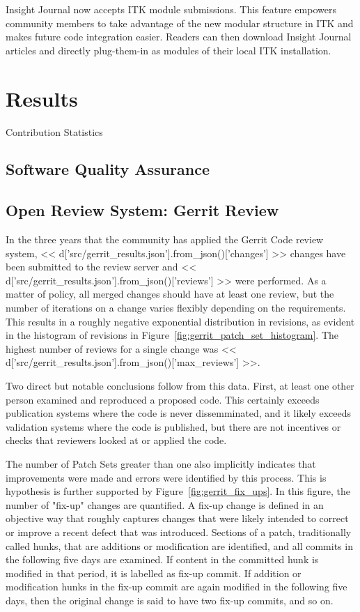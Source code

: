 \documentclass{frontiersENG} %
\begin{document}
\begin{enumeruate}
Insight Journal now accepts ITK module submissions. This feature empowers community members to take advantage of the new modular structure in ITK and makes future code integration easier. Readers can then download Insight Journal articles and directly plug-them-in as modules of their local ITK installation.


\section{Results}

Contribution Statistics
\subsection{Software Quality Assurance}

\subsection{Open Review System: Gerrit Review}
In the three years that the community has applied the Gerrit Code review
system, << d['src/gerrit_results.json'].from_json()['changes'] >> changes have
been submitted to the review server and
<< d['src/gerrit_results.json'].from_json()['reviews'] >> were performed.
As a matter of policy, all merged changes should have at least one review,
but the number of iterations on a change varies flexibly depending on the
requirements. This results in a roughly negative exponential distribution in
revisions, as evident in the histogram of revisions in
Figure~\ref{fig:gerrit_patch_set_histogram}.  The highest number of reviews
for a single change was
<< d['src/gerrit_results.json'].from_json()['max_reviews'] >>.

Two direct but notable conclusions follow from this data. First, at least one
other person examined and reproduced a proposed code.  This certainly exceeds
publication systems where the code is never dissemminated, and it likely
exceeds validation systems where the code is published, but there are not
incentives or checks that reviewers looked at or applied the code.

The number of Patch Sets greater than one also implicitly indicates that
improvements were made and errors were identified by this process.  This is
hypothesis is further supported by Figure~\ref{fig:gerrit_fix_ups}.  In this
figure, the number of "fix-up" changes are quantified. A fix-up change is
defined in an objective way that roughly captures changes that were likely
intended to correct or improve a recent defect that was introduced.  Sections
of a patch, traditionally called hunks, that are additions or modification are
identified, and all commits in the following five days are examined.  If
content in the committed hunk is modified in that period, it is labelled as
fix-up commit.  If addition or modification hunks in the fix-up commit are again
modified in the following five days, then the original change is said to have
two fix-up commits, and so on.


\end{enumeruate}
\end{document}
